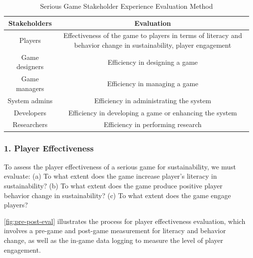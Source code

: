 \documentclass{sigchi}
\newcommand\tabhead[1]{\small\textbf{#1}}
\begin{document}
\begin{table}
  \centering
  \begin{tabular}{|c|c|}
    \hline
    \multicolumn{1}{|p{0.3\columnwidth}|}{\centering\tabhead{Stakeholders}} &
    \multicolumn{1}{|p{0.65\columnwidth}|}{\centering\tabhead{Evaluation}} \\
    \hline
    \multicolumn{1}{|p{0.3\columnwidth}|}{Players} &
    \multicolumn{1}{|p{0.65\columnwidth}|}{Effectiveness of the game
      to players in terms of literacy and behavior change in
      sustainability, player engagement} \\ 
    \hline
    \multicolumn{1}{|p{0.3\columnwidth}|}{Game designers} & \multicolumn{1}{|p{0.65\columnwidth}|}{Efficiency in designing a game} \\
    \hline
    \multicolumn{1}{|p{0.3\columnwidth}|}{Game managers} & \multicolumn{1}{|p{0.65\columnwidth}|}{Efficiency in managing a game} \\
    \hline
    \multicolumn{1}{|p{0.3\columnwidth}|}{System admins} & \multicolumn{1}{|p{0.65\columnwidth}|}{Efficiency in administrating the system} \\
    \hline
    \multicolumn{1}{|p{0.3\columnwidth}|}{Developers} & \multicolumn{1}{|p{0.65\columnwidth}|}{Efficiency in developing a game or enhancing the system} \\
    \hline
    \multicolumn{1}{|p{0.3\columnwidth}|}{Researchers} & \multicolumn{1}{|p{0.65\columnwidth}|}{Efficiency in performing research} \\
    \hline
  \end{tabular}
  \caption{Serious Game Stakeholder Experience Evaluation Method}
  \label{tab:evaluation-framework}
\end{table}

\subsubsection{1. Player Effectiveness}

To assess the player effectiveness of a serious game for
sustainability, we must evaluate: (a) To what extent does the game
increase player's literacy in sustainability? (b) To what extent does
the game produce positive player behavior change in sustainability?
(c) To what extent does the game engage players?

\autoref{fig:pre-post-eval} illustrates the process for player
effectiveness evaluation, which involves a pre-game and post-game
measurement for literacy and behavior change, as well as the in-game
data logging to measure the level of player engagement.
\end{document}
